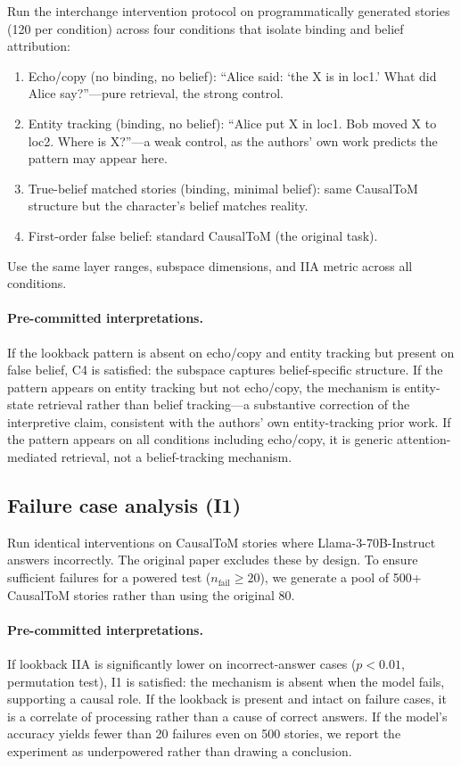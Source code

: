 \documentclass[11pt]{article}
\begin{document}
Run the interchange intervention protocol on programmatically generated stories (120 per condition) across four conditions that isolate binding and belief attribution:

\begin{enumerate}
\item Echo/copy (no binding, no belief): ``Alice said: `the X is in loc1.' What did Alice say?''---pure retrieval, the strong control.
\item Entity tracking (binding, no belief): ``Alice put X in loc1. Bob moved X to loc2. Where is X?''---a weak control, as the authors' own work predicts the pattern may appear here.
\item True-belief matched stories (binding, minimal belief): same CausalToM structure but the character's belief matches reality.
\item First-order false belief: standard CausalToM (the original task).
\end{enumerate}

Use the same layer ranges, subspace dimensions, and IIA metric across all conditions.

\paragraph{Pre-committed interpretations.} If the lookback pattern is absent on echo/copy and entity tracking but present on false belief, C4 is satisfied: the subspace captures belief-specific structure. If the pattern appears on entity tracking but not echo/copy, the mechanism is entity-state retrieval rather than belief tracking---a substantive correction of the interpretive claim, consistent with the authors' own entity-tracking prior work. If the pattern appears on all conditions including echo/copy, it is generic attention-mediated retrieval, not a belief-tracking mechanism.

\subsection{Failure case analysis (I1)}
\label{sec:failure}

Run identical interventions on CausalToM stories where Llama-3-70B-Instruct answers incorrectly. The original paper excludes these by design. To ensure sufficient failures for a powered test ($n_{\text{fail}} \geq 20$), we generate a pool of 500+ CausalToM stories rather than using the original 80.

\paragraph{Pre-committed interpretations.} If lookback IIA is significantly lower on incorrect-answer cases ($p < 0.01$, permutation test), I1 is satisfied: the mechanism is absent when the model fails, supporting a causal role. If the lookback is present and intact on failure cases, it is a correlate of processing rather than a cause of correct answers. If the model's accuracy yields fewer than 20 failures even on 500 stories, we report the experiment as underpowered rather than drawing a conclusion.
\end{document}

